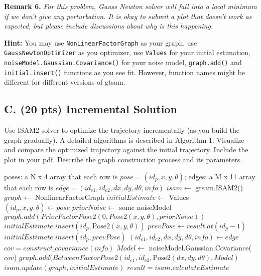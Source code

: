 \documentclass[tp]{lcc}
\begin{document}
\textbf{Remark 6.} \textit{For this problem, Gauss Newton solver will fall into a local minimum if we don't give any perturbation. It is okay to submit a plot that doesn't work as expected, but please include discussions about why is this happening.}

\textbf{Hint:} You may use \lstinline[style=bash]{NonLinearFactorGraph} as your graph, use \lstinline[style=bash]{GaussNewtonOptimizer} as you optimizer, use \lstinline[style=bash]{Values} for your initial estimation, \lstinline[style=bash]{noiseModel.Gaussian.Covariance()} for your noise model, \lstinline[style=bash]{graph.add()} and \lstinline[style=bash]{initial.insert()} functions as you see fit. However, function names might be different for different versions of gtsam.

\subsection{C. (20 pts) Incremental Solution}
Use ISAM2 solver to optimize the trajectory incrementally (as you build the graph gradually). A detailed algorithms is described in Algorithm 1. Visualize and compare the optimized trajectory against the initial trajectory. Include the plot in your pdf. Describe the graph construction process and its parameters.

\begin{algorithmic}[1]
\Require poses: a N x 4 array that each row is $pose=(id_{p},x,y,\theta)$; edges: a M x 11 array that each row is $edge=(id_{e1},id_{e2},dx,dy,d\theta,info)$
\State $isam \leftarrow$ gtsam.ISAM2() 
    \State $graph \leftarrow$ NonlinearFactorGraph 
    \State $initialEstimate \leftarrow$ Values 
    \State $(id_{p},x,y,\theta) \gets pose$ 
        \State $priorNoise \leftarrow$ some noiseModel 
        \State $graph.add(PriorFactorPose2(0,Pose2(x,y,\theta),priorNoise))$
        \State $initialEstimate.insert(id_{p},\text{Pose2}(x,y,\theta))$
    \Else {}
        \State $prevPose \gets result.at(id_{p}-1)$ 
        \State $initialEstimate.insert(id_{p},prevPose)$
    \EndIf
        \State $(id_{e1},id_{e2},dx,dy,d\theta,info) \gets edge$ 
            \State $cov=construct\_covariance(info)$ 
            \State $Model \leftarrow$ noiseModel.Gaussian.Covariance($cov$)
            \State $graph.add(BetweenFactorPose2(id_{e1},id_{e2},\text{Pose2}(dx,dy,d\theta),Model)$
        \EndIf
    \EndFor
    \State $isam.update(graph,initialEstimate)$
    \State $result=isam.calculateEstimate$
\EndFor
\end{algorithmic}
\end{document}
